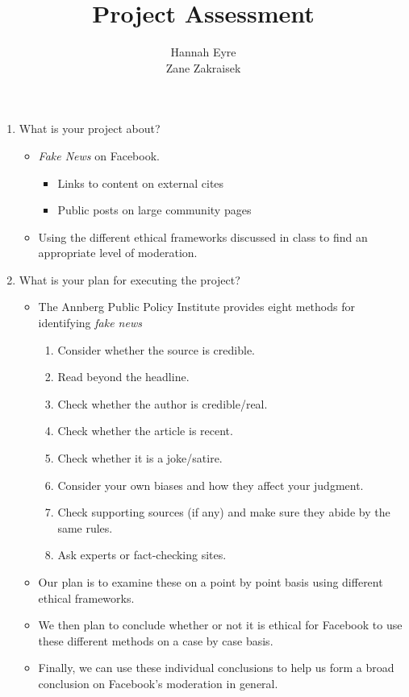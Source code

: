 \documentclass[11pt]{article}
\title{Project Assessment}
\author{Hannah Eyre\\
	Zane Zakraisek}
\begin{document}
\maketitle



\begin{enumerate}

  \item What is your project about?
    \begin{itemize}
      \item \textit{Fake News} on Facebook.
        \begin{itemize}
          \item Links to content on external cites
          \item Public posts on large community pages
        \end{itemize}
      \item Using the different ethical frameworks discussed in class to find an appropriate level of moderation.
    \end{itemize}

  \item What is your plan for executing the project?
    \begin{itemize}
      \item The Annberg Public Policy Institute provides eight methods for identifying \textit{fake news}
        \begin{enumerate}
          \item Consider whether the source is credible.
          \item Read beyond the headline.
          \item Check whether the author is credible/real.
          \item Check whether the article is recent.
          \item Check whether it is a joke/satire.
          \item Consider your own biases and how they affect your judgment.
          \item Check supporting sources (if any) and make sure they abide by the same rules.
          \item Ask experts or fact-checking sites.
        \end{enumerate}
      \item Our plan is to examine these on a point by point basis using different ethical frameworks.
      \item We then plan to conclude whether or not it is ethical for Facebook to use these different methods on a case by case basis.
      \item Finally, we can use these individual conclusions to help us form a broad conclusion on Facebook's moderation in general.
    \end{itemize}


\end{enumerate}
\end{document}
